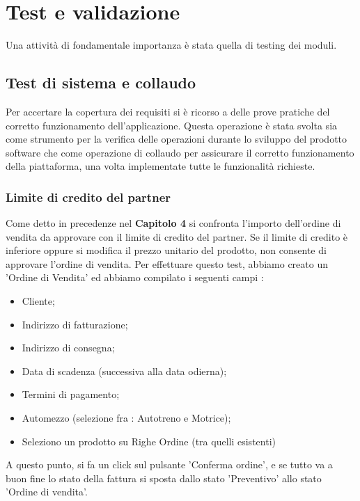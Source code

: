 
\hypertarget{(chap:capitolo5)}{}
\chapter{Test e validazione}
Una attività di fondamentale importanza è stata quella di testing dei moduli.


\section{Test di sistema e collaudo}

Per accertare la copertura dei requisiti si è ricorso a delle prove pratiche del corretto funzionamento dell’applicazione. Questa operazione è stata svolta sia come strumento per la verifica delle operazioni durante lo sviluppo del prodotto software che come operazione di collaudo per assicurare il corretto funzionamento della piattaforma, una volta implementate tutte le funzionalità richieste.

\subsection{Limite di credito del partner}

Come detto in precedenze nel \hypertarget{(chap:capitolo4)}{\textbf{Capitolo 4}} si confronta l'importo dell'ordine di vendita da approvare con il limite di credito del partner. Se il limite di credito è inferiore oppure si modifica il prezzo unitario del prodotto, non consente di approvare l'ordine di vendita.
\newpage
Per effettuare questo test, abbiamo creato un 'Ordine di Vendita' ed abbiamo compilato i seguenti campi :
\begin{itemize}
\item Cliente;
\item Indirizzo di fatturazione;
\item Indirizzo di consegna;
\item Data di scadenza (successiva alla data odierna);
\item Termini di pagamento;
\item Automezzo (selezione fra : Autotreno e Motrice);
\item Seleziono un prodotto su Righe Ordine (tra quelli esistenti)
\end{itemize}

A questo punto, si fa un click sul pulsante 'Conferma ordine', e se tutto va a buon fine lo stato della fattura si sposta dallo stato 'Preventivo' allo stato 'Ordine di vendita'.


